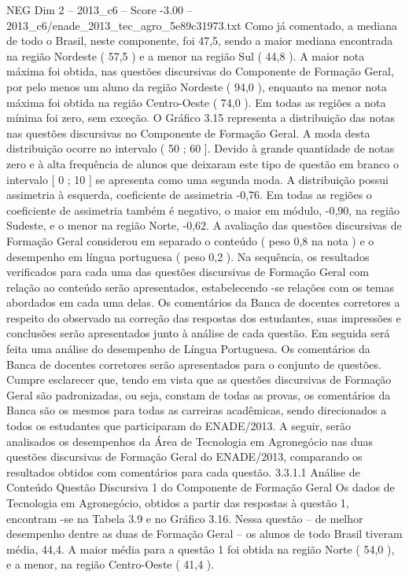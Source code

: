 \begin{textsample}{NEG Dim 2 – 2013\_c6 – Score -3.00 – 2013\_c6/enade\_2013\_tec\_agro\_5e89c31973.txt}
Como já comentado, a mediana de todo o Brasil, neste componente, foi 47,5, sendo a maior mediana encontrada na região Nordeste ( 57,5 ) e a menor na região Sul ( 44,8 ).
A maior nota máxima foi obtida, nas questões discursivas do Componente de Formação Geral, por pelo menos um aluno da região Nordeste ( 94,0 ), enquanto na menor nota máxima foi obtida na região Centro-Oeste ( 74,0 ).
Em todas as regiões a nota mínima foi zero, sem exceção.
O Gráfico 3.15 representa a distribuição das notas nas questões discursivas no Componente de Formação Geral.
A moda desta distribuição ocorre no intervalo ( 50 ; 60 ].
Devido à grande quantidade de notas zero e à alta frequência de alunos que deixaram este tipo de questão em branco o intervalo [ 0 ; 10 ] se apresenta como uma segunda moda.
A distribuição possui assimetria à esquerda, coeficiente de assimetria -0,76.
Em todas as regiões o coeficiente de assimetria também é negativo, o maior em módulo, -0,90, na região Sudeste, e o menor na região Norte, -0,62.
A avaliação das questões discursivas de Formação Geral considerou em separado o conteúdo ( peso 0,8 na nota ) e o desempenho em língua portuguesa ( peso 0,2 ).
Na sequência, os resultados verificados para cada uma das questões discursivas de Formação Geral com relação ao conteúdo serão apresentados, estabelecendo -se relações com os temas abordados em cada uma delas.
Os comentários da Banca de docentes corretores a respeito do observado na correção das respostas dos estudantes, suas impressões e conclusões serão apresentados junto à análise de cada questão.
Em seguida será feita uma análise do desempenho de Língua Portuguesa.
Os comentários da Banca de docentes corretores serão apresentados para o conjunto de questões.
Cumpre esclarecer que, tendo em vista que as questões discursivas de Formação Geral são padronizadas, ou seja, constam de todas as provas, os comentários da Banca são os mesmos para todas as carreiras acadêmicas, sendo direcionados a todos os estudantes que participaram do ENADE/2013.
A seguir, serão analisados os desempenhos da Área de Tecnologia em Agronegócio nas duas questões discursivas de Formação Geral do ENADE/2013, comparando os resultados obtidos com comentários para cada questão. 3.3.1.1 Análise de Conteúdo Questão Discursiva 1 do Componente de Formação Geral Os dados de Tecnologia em Agronegócio, obtidos a partir das respostas à questão 1, encontram -se na Tabela 3.9 e no Gráfico 3.16.
Nessa questão – de melhor desempenho dentre as duas de Formação Geral – os alunos de todo Brasil tiveram média, 44,4.
A maior média para a questão 1 foi obtida na região Norte ( 54,0 ), e a menor, na região Centro-Oeste ( 41,4 ).

\end{textsample}
